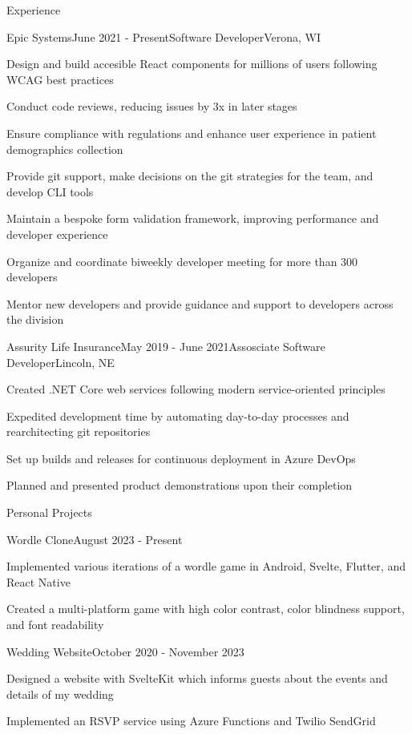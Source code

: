 \documentclass[
	11pt, %
]{resume} %
\begin{document}
\begin{rSection}{Experience}

	\begin{rSubsection}{Epic Systems}{June 2021 - Present}{Software Developer}{Verona, WI}
		\item Design and build accesible React components for millions of users following WCAG best practices
		\item Conduct code reviews, reducing issues by 3x in later stages
		\item Ensure compliance with regulations and enhance user experience in patient demographics collection
		\item Provide git support, make decisions on the git strategies for the team, and develop CLI tools
		\item Maintain a bespoke form validation framework, improving performance and developer experience
		\item Organize and coordinate biweekly developer meeting for more than 300 developers
		\item Mentor new developers and provide guidance and support to developers across the division
	\end{rSubsection}

	\begin{rSubsection}{Assurity Life Insurance}{May 2019 - June 2021}{Assosciate Software Developer}{Lincoln, NE}
		\item Created .NET Core web services following modern service-oriented principles
		\item Expedited development time by automating day-to-day processes and rearchitecting git repositories
		\item Set up builds and releases for continuous deployment in Azure DevOps
		\item Planned and presented product demonstrations upon their completion
	\end{rSubsection}

\end{rSection}

\begin{rSection}{Personal Projects}

	\begin{rSubsection}{Wordle Clone}{August 2023 - Present}{}{}
		\item Implemented various iterations of a wordle game in Android, Svelte, Flutter, and React Native
		\item Created a multi-platform game with high color contrast, color blindness support, and font readability
	\end{rSubsection}

	\begin{rSubsection}{Wedding Website}{October 2020 - November 2023}{}{}
		\item Designed a website with SvelteKit which informs guests about the events and details of my wedding
		\item Implemented an RSVP service using Azure Functions and Twilio SendGrid
	\end{rSubsection}

\end{rSection}
\end{document}

